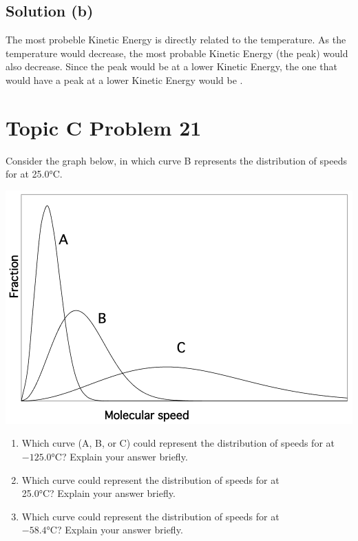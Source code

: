\documentclass[10pt]{article}
\begin{document}
        \subsection{Solution (b)}
            The most probeble Kinetic Energy is directly related to the temperature.
            As the temperature would decrease, the most probable Kinetic Energy (the peak) would also decrease.
            Since the peak would be at a lower Kinetic Energy, the one that would have a peak at a lower Kinetic Energy would be .

    \pagebreak
    \section{Topic C Problem 21}
        Consider the graph below, in which curve B represents the distribution of speeds for  at 25.0\unit{\celsius}.
        \begin{center}
            \includegraphics[width=\textwidth]{picture_C-21.png}
        \end{center}

        \begin{enumerate} [label=\alph*)]
            \item Which curve (A, B, or C) could represent the distribution of speeds for  at $-125.0\unit{\celsius}$? Explain your answer briefly.
            \item Which curve could represent the distribution of speeds for  at \\25.0\unit{\celsius}? Explain your answer briefly.
            \item Which curve could represent the distribution of speeds for  at \\$-58.4\unit{\celsius}$? Explain your answer briefly.
        \end{enumerate}
\end{document}
